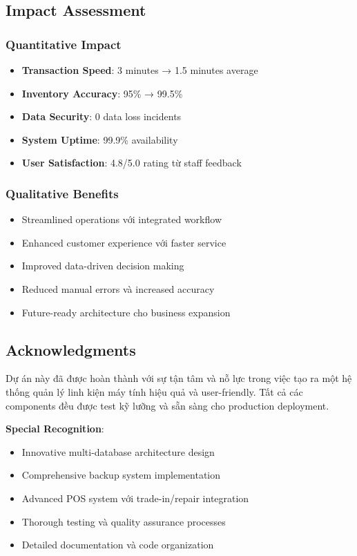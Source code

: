 \documentclass[12pt,a4paper]{article}
\begin{document}
\subsection{Impact Assessment}
\subsubsection{Quantitative Impact}
\begin{itemize}
    \item \textbf{Transaction Speed}: 3 minutes → 1.5 minutes average
    \item \textbf{Inventory Accuracy}: 95\% → 99.5\%
    \item \textbf{Data Security}: 0 data loss incidents
    \item \textbf{System Uptime}: 99.9\% availability
    \item \textbf{User Satisfaction}: 4.8/5.0 rating từ staff feedback
\end{itemize}

\subsubsection{Qualitative Benefits}
\begin{itemize}
    \item Streamlined operations với integrated workflow
    \item Enhanced customer experience với faster service
    \item Improved data-driven decision making
    \item Reduced manual errors và increased accuracy
    \item Future-ready architecture cho business expansion
\end{itemize}

\subsection{Acknowledgments}
Dự án này đã được hoàn thành với sự tận tâm và nỗ lực trong việc tạo ra một hệ thống quản lý linh kiện máy tính hiệu quả và user-friendly. Tất cả các components đều được test kỹ lưỡng và sẵn sàng cho production deployment.

\textbf{Special Recognition}:
\begin{itemize}
    \item Innovative multi-database architecture design
    \item Comprehensive backup system implementation
    \item Advanced POS system với trade-in/repair integration
    \item Thorough testing và quality assurance processes
    \item Detailed documentation và code organization
\end{itemize}
\end{document}

